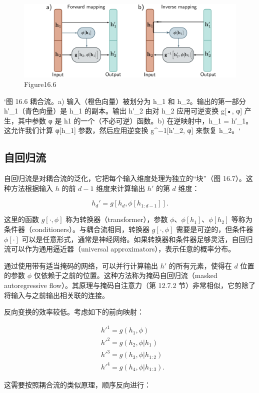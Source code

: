 \begin{figure}[h!]
\centering
\includegraphics[width=0.7\linewidth]{png/chapter16/FlowCoupling.png}
\caption{Figure16.6}
\end{figure}

`图 16.6 耦合流。a) 输入（橙色向量）被划分为 h_1 和 h_2。输出的第一部分 h′_1（青色向量）是 h_1 的副本。输出 h′_2 由对 h_2 应用可逆变换 g[•, φ] 产生，其中参数 φ 是 h1 的一个（不必可逆）函数。b) 在逆映射中，h_1 = h′_1。这允许我们计算 φ[h_1] 参数，然后应用逆变换 g^−1[h′_2, φ] 来恢复 h_2。`

\subsection{自回归流}
自回归流是对耦合流的泛化，它把每个输入维度处理为独立的“块”（图 16.7）。这种方法根据输入 \(h\) 的前 \(d-1\) 维度来计算输出 \(h'\) 的第 \(d\) 维度：

\[
h_d' = g[h_d, \phi[h_{1:d-1}]]. \tag{16.15}
\]

这里的函数 \(g[\cdot, \phi]\) 称为转换器（transformer），参数 \(\phi\)、\(\phi[h_1]\)、\(\phi[h_2]\) 等称为条件器（conditioners）。与耦合流相同，转换器 \(g[\cdot, \phi]\) 需要是可逆的，但条件器 \(\phi[\cdot]\) 可以是任意形式，通常是神经网络。如果转换器和条件器足够灵活，自回归流可以作为通用逼近器（universal approximators），表示任意的概率分布。

通过使用带有适当掩码的网络，可以并行计算输出 \(h'\) 的所有元素，使得在 \(d\) 位置的参数 \(\phi\) 仅依赖于之前的位置。这种方法称为掩码自回归流（masked autoregressive flow）。其原理与掩码自注意力（第 12.7.2 节）非常相似，它剪除了将输入与之前输出相关联的连接。

反向变换的效率较低。考虑如下的前向映射：


\begin{align}
&h'^1 = g(h_1, \phi) \\
&h'^2 = g(h_2, \phi|h_1) \\
&h'^3 = g(h_3, \phi|h_{1:2}) \\
&h'^4 = g(h_4, \phi|h_{1:3}) .
\end{align} 


这需要按照耦合流的类似原理，顺序反向进行：


